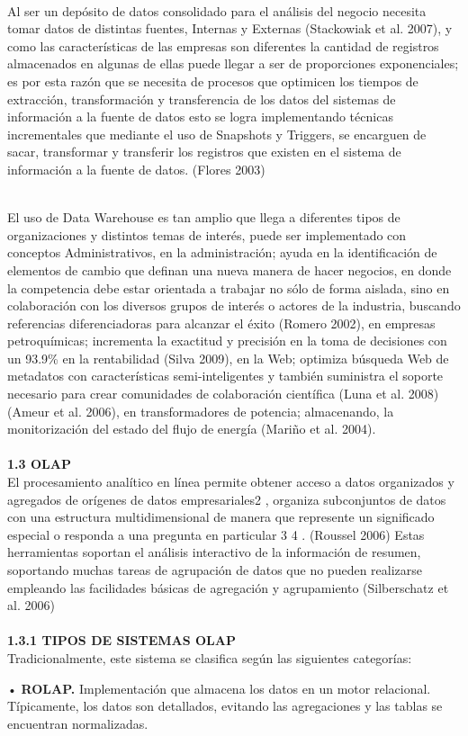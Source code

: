 \begin{flushleft}
\textbf{}\\
Al ser un depósito de datos consolidado para el análisis del negocio necesita tomar datos de distintas fuentes, Internas y Externas (Stackowiak et al. 2007), y como las características de las empresas son diferentes la cantidad de registros almacenados en algunas de ellas puede llegar a ser de proporciones exponenciales; es por esta razón que se necesita de procesos que optimicen los tiempos de extracción, transformación y transferencia de los datos del sistemas de información a la fuente de datos esto se logra implementando técnicas incrementales que mediante el uso de Snapshots y Triggers, se encarguen de sacar, transformar y transferir los registros que existen en el sistema de información a la fuente de datos. (Flores 2003)

\textbf{}\\

El uso de Data Warehouse es tan amplio que llega a diferentes tipos de organizaciones y distintos temas de interés, puede ser implementado con conceptos Administrativos, en la administración; ayuda en la identificación de elementos de cambio que definan una nueva manera de hacer negocios, en donde la competencia debe estar orientada a trabajar no sólo de forma aislada, sino en colaboración con los diversos grupos de interés o actores de la industria, buscando referencias diferenciadoras para alcanzar el éxito (Romero 2002), en empresas petroquímicas; incrementa la exactitud y precisión en la toma de decisiones con un 93.9\% en la rentabilidad (Silva 2009), en la Web; optimiza búsqueda Web de metadatos con características semi-inteligentes y también suministra el soporte necesario para crear comunidades de colaboración científica (Luna et al. 2008) (Ameur et al. 2006), en transformadores de potencia; almacenando, la monitorización del estado del flujo de energía (Mariño et al. 2004).
\textbf{}\\
\textbf{}\\
\textbf{1.3 OLAP}\\
El procesamiento analítico en línea permite obtener acceso a datos organizados y agregados de orígenes de datos empresariales2 , organiza subconjuntos de datos con una estructura multidimensional de manera que represente un significado especial o responda a una pregunta en particular 3 4 . (Roussel 2006) Estas herramientas soportan el análisis interactivo de la información de resumen, soportando muchas tareas de agrupación de datos que no pueden realizarse empleando las facilidades básicas de agregación y agrupamiento (Silberschatz et al. 2006)\textbf{}\\
\textbf{}\\
\textbf{1.3.1 TIPOS DE SISTEMAS OLAP}\\
Tradicionalmente, este sistema se clasifica según las siguientes categorías: 
\textbf{}\\
\item • \textbf{ROLAP.} Implementación que almacena los datos en un motor relacional. Típicamente, los datos son detallados, evitando las agregaciones y las tablas se encuentran normalizadas. \textbf{}\\


\end{flushleft}
